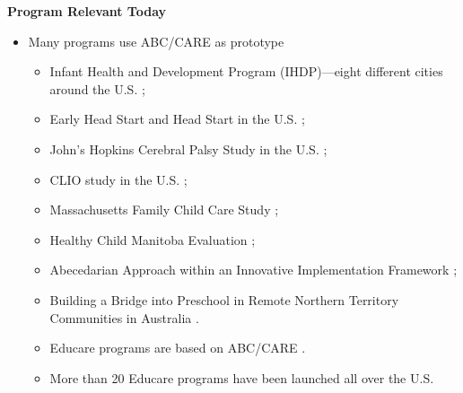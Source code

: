 \documentclass[static]{JJH-Beamer}
\begin{document}
\begin{frame}

\begin{center}
\textbf{Program Relevant Today}
\end{center}

\begin{itemize}
\item Many programs use ABC/CARE as prototype
        \begin{itemize}
        \item Infant Health and Development Program (IHDP)---eight different cities around the U.S. \citep{Spiker-etal_1997_Helping};
        \item Early Head Start and Head Start in the U.S. \citep{Schneider_McDonald-eds_2007_Scale-Up_Vol-1};
        \item John's Hopkins Cerebral Palsy Study in the U.S. \citep{Sparling_2010_Highlights};
        \item CLIO study in the U.S. \citep{Sparling_2010_Highlights};
        \item Massachusetts Family Child Care Study \citep{Collins_etal_2010_Massachusetts-Study};
        \item Healthy Child Manitoba Evaluation \citep{Healthy_Child_Manitoba_2015_Starting-Early};
        \item Abecedarian Approach within an Innovative Implementation Framework \citep{Jensen_Nielsen_2016_ABC-Programme-Pilot};
        \item Building a Bridge into Preschool in Remote Northern Territory Communities in Australia \citep{UMonash_Dataset_2015_URL}.
        \item Educare programs are based on ABC/CARE \citep{Educare_2014_Research_Agenda,Yazejian_Bryant_2012_Educare}.
        \item More than 20 Educare programs have been launched all over the U.S.
        \end{itemize}
\end{itemize}

\end{frame}
\end{document}

